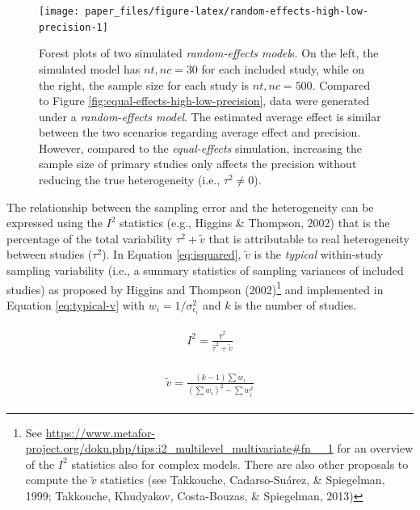 \documentclass[
  man,floatsintext]{apa6}
\begin{document}
\scriptsize

\begin{figure}[H]

{\centering \texttt{[image: paper\_files/figure-latex/random-effects-high-low-precision-1]} 

}

\caption{Forest plots of two simulated \emph{random-effects model}s. On the left, the simulated model has \(nt,nc = 30\) for each included study, while on the right, the sample size for each study is \(nt,nc = 500\). Compared to Figure \ref{fig:equal-effects-high-low-precision}, data were generated under a \emph{random-effects model}. The estimated average effect is similar between the two scenarios regarding average effect and precision. However, compared to the \emph{equal-effects} simulation, increasing the sample size of primary studies only affects the precision without reducing the true heterogeneity (i.e., \(\tau^{2} \neq 0\)).}\label{fig:random-effects-high-low-precision}
\end{figure}

\normalsize

The relationship between the sampling error and the heterogeneity can be expressed using the \(I^{2}\) statistics (e.g., Higgins \& Thompson, 2002) that is the percentage of the total variability \(\tau^{2} + \tilde{v}\) that is attributable to real heterogeneity between studies (\(\tau^{2}\)). In Equation \eqref{eq:isquared}, \(\tilde{v}\) is the \emph{typical} within-study sampling variability (i.e., a summary statistics of sampling variances of included studies) as proposed by Higgins and Thompson (2002)\footnote{See \url{https://www.metafor-project.org/doku.php/tips:i2_multilevel_multivariate\#fn__1} for an overview of the \(I^2\) statistics also for complex models. There are also other proposals to compute the \(\tilde{v}\) statistics (see Takkouche, Cadarso-Suárez, \& Spiegelman, 1999; Takkouche, Khudyakov, Costa-Bouzas, \& Spiegelman, 2013)} and implemented in Equation \eqref{eq:typical-v} with \(w_i = 1/\sigma_{\epsilon_i}^{2}\) and \(k\) is the number of studies.

\begin{align}
\begin{gathered}
I^2 = \frac{\hat{\tau}^2}{\hat{\tau}^2 + \tilde{v}}
\label{eq:isquared}
\end{gathered}
\end{align}

\begin{align}
\begin{gathered}
\tilde{v} = \frac{(k-1) \sum w_i}{(\sum w_i)^2 - \sum w_i^2}
\label{eq:typical-v}
\end{gathered}
\end{align}
\end{document}

